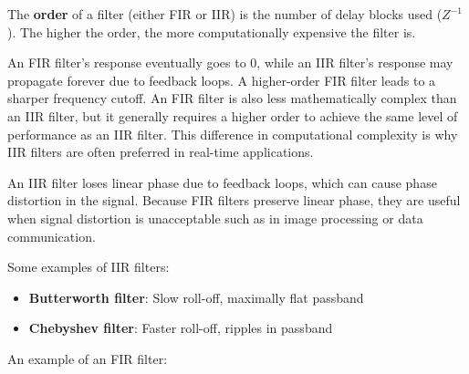 The \textbf{order} of a filter (either FIR or IIR) is the number of delay blocks used ($Z^{-1}$). The higher the order, the more computationally expensive the filter is.

\vsp

An FIR filter's response eventually goes to 0, while an IIR filter's response may propagate forever due to feedback loops. A higher-order FIR filter leads to a sharper frequency cutoff. An FIR filter is also less mathematically complex than an IIR filter, but it generally requires a higher order to achieve the same level of performance as an IIR filter. This difference in computational complexity is why IIR filters are often preferred in real-time applications.

\vsp

An IIR filter loses linear phase due to feedback loops, which can cause phase distortion in the signal. Because FIR filters preserve linear phase, they are useful when signal distortion is unacceptable such as in image processing or data communication.

\vsp

Some examples of IIR filters:

\begin{itemize}
    \item \textbf{Butterworth filter}: Slow roll-off, maximally flat passband
    \item \textbf{Chebyshev filter}: Faster roll-off, ripples in passband
\end{itemize}

\vsp

An example of an FIR filter:

